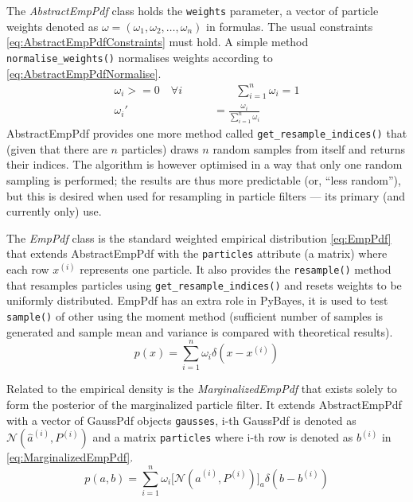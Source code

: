 The \emph{AbstractEmpPdf} class holds the \verb|weights| parameter, a vector of particle weights denoted as
\(\omega = (\omega_1, \omega_2, \dotsc, \omega_n)\) in formulas. The usual constraints
\eqref{eq:AbstractEmpPdfConstraints} must hold. A simple method \verb|normalise_weights()| normalises
weights according to \eqref{eq:AbstractEmpPdfNormalise}.
\begin{align}
	\omega_i >= 0 \quad \forall i \quad \quad & \quad \quad \sum_{i=1}^n \omega_i = 1 \label{eq:AbstractEmpPdfConstraints} \\
	\omega_i' &= \frac{\omega_i}{\sum_{i=1}^n \omega_i} \label{eq:AbstractEmpPdfNormalise}
\end{align}
AbstractEmpPdf provides one more method called \verb|get_resample_indices()| that
(given that there are \(n\) particles) draws \(n\) random samples from itself and returns their
indices. The algorithm is however optimised in a way that only one random sampling is performed; the
results are thus more predictable (or, ``less random''), but this is desired when used for resampling
in particle filters --- its primary (and currently only) use.

The \emph{EmpPdf} class is the standard weighted empirical distribution \eqref{eq:EmpPdf} that extends
AbstractEmpPdf with the \verb|particles| attribute (a matrix) where each row \(x^{(i)}\) represents
one particle. It also provides the \verb|resample()| method that resamples particles using
\verb|get_resample_indices()| and resets weights to be uniformly distributed. EmpPdf has an extra
role in PyBayes, it is used to test \verb|sample()| of other {\pdfs} using the moment method
(sufficient number of samples is generated and sample mean and variance is compared with theoretical
results).
\begin{equation} \label{eq:EmpPdf}
	p(x) = \sum_{i=1}^n \omega_i \delta(x - x^{(i)})
\end{equation}

Related to the empirical density is the \emph{MarginalizedEmpPdf} that exists solely to form the
posterior {\pdf} of the marginalized particle filter. It extends AbstractEmpPdf with a vector of
GaussPdf objects \verb|gausses|, i-th GaussPdf is denoted as \(\mathcal{N}\left(\hat{a}^{(i)},
P^{(i)}\right)\) and a matrix \verb|particles| where i-th row is denoted as \(b^{(i)}\) in
\eqref{eq:MarginalizedEmpPdf}.
\begin{equation} \label{eq:MarginalizedEmpPdf}
	p(a, b) = \sum_{i=1}^n \omega_i \Big[ \mathcal{N}\left(\hat{a}^{(i)}, P^{(i)}\right) \Big]_a
		\delta(b - b^{(i)})
\end{equation}

